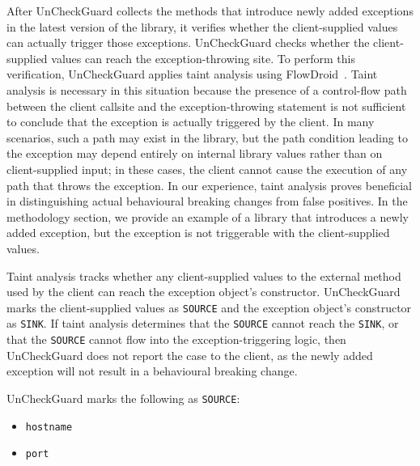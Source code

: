 After UnCheckGuard collects the methods that introduce newly added exceptions in the latest version of the library, it verifies whether the client-supplied values can actually trigger those exceptions. UnCheckGuard checks whether the client-supplied values can reach the exception-throwing site. To perform this verification, UnCheckGuard applies taint analysis using FlowDroid~\cite{Arzt14:_flowdroid}. Taint analysis is necessary in this situation because the presence of a control-flow path between the client callsite and the exception-throwing statement is not sufficient to conclude that the exception is actually triggered by the client. In many scenarios, such a path may exist in the library, but the path condition leading to the exception may depend entirely on internal library values rather than on client-supplied input; in these cases, the client cannot cause the execution of any path that throws the exception. In our experience, taint analysis proves beneficial in distinguishing actual behavioural breaking changes from false positives. In the methodology section, we provide an example of a library that introduces a newly added exception, but the exception is not triggerable with the client-supplied values.



Taint analysis tracks whether any client-supplied values to the external method used by the client can reach the exception object's constructor. UnCheckGuard marks the client-supplied values as \texttt{SOURCE} and the exception object's constructor as \texttt{SINK}. If taint analysis determines that the \texttt{SOURCE} cannot reach the \texttt{SINK}, or that the \texttt{SOURCE} cannot flow into the exception-triggering logic, then UnCheckGuard does not report the case to the client, as the newly added exception will not result in a behavioural breaking change.

UnCheckGuard marks the following as \texttt{SOURCE}:
\begin{itemize}
  \item \texttt{hostname}
  \item \texttt{port}
\end{itemize}

